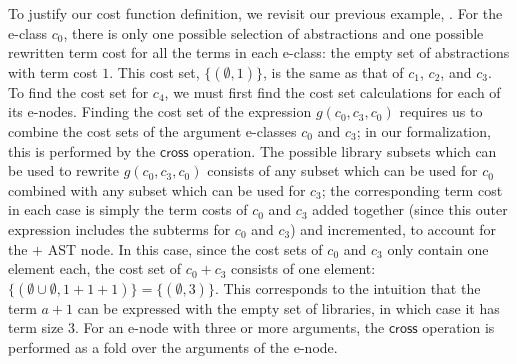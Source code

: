 To justify our cost function definition, we revisit our previous
example, .
%
For the e-class $c_0$, there is only one possible selection
of abstractions and one possible rewritten term cost for all the
terms in each e-class: the empty set of abstractions with term cost $1$.
%
This cost set, $\{ (\emptyset, 1) \}$, is the same as that of $c_1$,
$c_2$, and $c_3$.
%
To find the cost set for $c_4$, we must first find the cost set
calculations for each of its e-nodes.
%
Finding the cost set of the expression $g(c_0, c_3, c_0)$ requires
us to combine the cost sets of the argument e-classes $c_0$
and $c_3$;
in our formalization, this is performed by the $\mathsf{cross}$
operation.
%
The possible library subsets which can be used to rewrite $g(c_0, c_3, c_0)$
consists of any subset which can be used for $c_0$ combined
with any subset which can be used for $c_3$; the corresponding
term cost in each case is simply the term costs of $c_0$ and $c_3$ added
together (since this outer expression includes the subterms for $c_0$
and $c_3$) and incremented, to account for the $+$ AST node.
%
In this case, since the cost sets of $c_0$ and $c_3$ only contain one
element each, the cost set of $c_0 + c_3$ consists of one element:
$\{ (\emptyset \cup \emptyset, 1 + 1 + 1)\} = \{ (\emptyset, 3) \}$.
%
This corresponds to the intuition that the term $a + 1$ can be
expressed with the empty set of libraries, in which case it has term
size $3$.
%
For an e-node with three or more arguments, the $\mathsf{cross}$
operation is performed as a fold over the arguments of the e-node.

